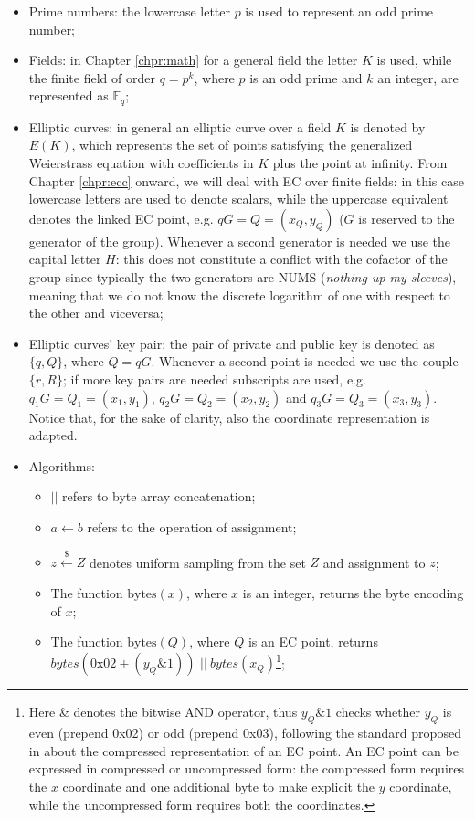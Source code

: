 \begin{itemize}
\item Prime numbers: the lowercase letter $p$ is used to represent an odd prime number;
\item Fields: in Chapter \ref{chpr:math} for a general field the letter $K$ is used, while the finite field of order $q = p^k$, where $p$ is an odd prime and $k$ an integer, are represented as $\mathbb{F}_q$;
\item Elliptic curves: in general an elliptic curve over a field $K$ is denoted by $E(K)$, which represents the set of points satisfying the generalized Weierstrass equation with coefficients in $K$ plus the point at infinity. From Chapter \ref{chpr:ecc} onward, we will deal with EC over finite fields: in this case lowercase letters are used to denote scalars, while the uppercase equivalent denotes the linked EC point, e.g. $qG = Q = (x_Q, y_Q)$ ($G$ is reserved to the generator of the group). Whenever a second generator is needed we use the capital letter $H$: this does not constitute a conflict with the cofactor of the group since typically the two generators are NUMS (\textit{nothing up my sleeves}), meaning that we do not know the discrete logarithm of one with respect to the other and viceversa;
\item Elliptic curves' key pair: the pair of private and public key is denoted as $\{q, Q\}$, where $Q = qG$. Whenever a second point is needed we use the couple $\{r, R\}$; if more key pairs are needed subscripts are used, e.g. $q_1G = Q_1 = (x_1, y_1)$, $q_2G = Q_2 = (x_2, y_2)$ and $q_3G = Q_3 = (x_3, y_3)$. Notice that, for the sake of clarity, also the coordinate representation is adapted.
\item Algorithms:
    \begin{itemize}
		\item $||$ refers to byte array concatenation;
		\item $a \gets b$ refers to the operation of assignment;
		\item $z \xleftarrow{\text{\$}} Z$ denotes uniform sampling from the set $Z$ and assignment to $z$;
		\item The function $\text{bytes}(x)$, where $x$ is an integer, returns the byte encoding of $x$;
		\item The function $\text{bytes}(Q)$, where $Q$ is an EC point, returns $bytes(0\text{x}02 + (y_Q \& 1))$ $ || \ bytes(x_Q)$\footnote{Here \& denotes the bitwise AND operator, thus $y_Q \& 1$ checks whether $y_Q$ is even (prepend 0x02) or odd (prepend 0x03), following the standard proposed in \cite{RefWork:2} about the compressed representation of an EC point. An EC point can be expressed in compressed or uncompressed form: the compressed form requires the $x$ coordinate and one additional byte to make explicit the $y$ coordinate, while the uncompressed form requires both the coordinates.};

\end{itemize}
\end{itemize}
